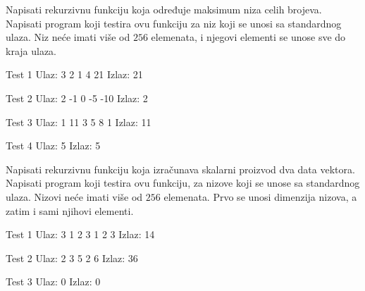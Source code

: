 \begin{Exercise}[label=109]
Napisati rekurzivnu funkciju koja određuje maksimum niza
  celih brojeva. Napisati program koji testira ovu funkciju za niz
  koji se unosi sa standardnog ulaza. Niz neće imati više od $256$ elemenata, i
  njegovi elementi se unose sve do kraja ulaza.
  
\begin{miditest}
\begin{test}{Test 1}
Ulaz:   3 2 1 4 21    
Izlaz: 21              
\end{test}
\end{miditest}
\begin{miditest}
\begin{test}{Test 2}
Ulaz:   2 -1 0 -5 -10
Izlaz: 2                
\end{test}
\end{miditest}

\begin{miditest}
\begin{test}{Test 3}
Ulaz:  1 11 3 5 8 1    
Izlaz: 11
\end{test}
\end{miditest}
\begin{minitest}
\begin{test}{Test 4}
Ulaz:   5
Izlaz:  5
\end{test}
\end{minitest}

\end{Exercise}
\begin{Answer}[ref=109]
\end{Answer}

\begin{Exercise}[label=110]
Napisati rekurzivnu funkciju  koja izračunava skalarni
  proizvod dva data vektora.  Napisati program koji testira ovu
  funkciju, za nizove koji se unose sa standardnog ulaza. Nizovi neće imati više od $256$ elemenata. Prvo se unosi dimenzija nizova, a zatim i sami njihovi elementi.
  
\begin{miditest}
\begin{test}{Test 1}
Ulaz:    3 1 2 3 1 2 3 
Izlaz:   14                 
\end{test}
\end{miditest}
\begin{miditest}
\begin{test}{Test 2}
Ulaz:   2 3 5 2 6       
Izlaz:  36              
\end{test}
\end{miditest}


\begin{minitest}
\begin{test}{Test 3}
Ulaz:   0
Izlaz:  0
\end{test}
\end{minitest}

\end{Exercise}
\begin{Answer}[ref=110]
\end{Answer}


